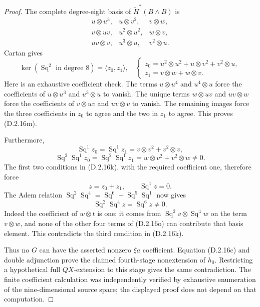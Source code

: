 \begin{proof}
The complete degree-eight basis of
$\widetilde H^*(B\wedge B)$ is
\[
\begin{array}{lll}
 u\otimes u^3,&u\otimes v^2,&v\otimes w,\\
 v\otimes uv,&u^2\otimes u^2,&w\otimes v,\\
 uv\otimes v,&u^3\otimes u,&v^2\otimes u.
\end{array}
 \tag{D.2.16l}
\]
Cartan gives
\[
 \ker(\operatorname{Sq}^2\text{ in degree }8)
       =\langle z_0,z_1\rangle,
 \quad
 \begin{cases}
 z_0=u^2\otimes u^2+u\otimes v^2+v^2\otimes u,\\
 z_1=v\otimes w+w\otimes v.
 \end{cases}
 \tag{D.2.16m}
\]
Here is an exhaustive coefficient check. The terms
$u\otimes u^4$ and $u^4\otimes u$ force the coefficients of
$u\otimes u^3$ and $u^3\otimes u$ to vanish. The unique terms
$w\otimes uv$ and $uv\otimes w$ force the coefficients of
$v\otimes uv$ and $uv\otimes v$ to vanish. The remaining
images force the three coefficients in $z_0$ to agree and the
two in $z_1$ to agree. This proves \textup{(D.2.16m)}.

Furthermore,
\[
 \operatorname{Sq}^1z_0=\operatorname{Sq}^1z_1
       =v\otimes v^2+v^2\otimes v,
\]
\[
 \operatorname{Sq}^2\operatorname{Sq}^1z_0
 =\operatorname{Sq}^2\operatorname{Sq}^1z_1
       =w\otimes v^2+v^2\otimes w\ne0.
 \tag{D.2.16n}
\]
The first two conditions in \textup{(D.2.16k)}, with the required
coefficient one, therefore force
\[
 z=z_0+z_1,
 \qquad\operatorname{Sq}^1z=0.
 \tag{D.2.16o}
\]
The Adem relation
$\operatorname{Sq}^2\operatorname{Sq}^4
 =\operatorname{Sq}^6+\operatorname{Sq}^5\operatorname{Sq}^1$
now gives
\[
 \operatorname{Sq}^2\operatorname{Sq}^4z
       =\operatorname{Sq}^6z\ne0.
 \tag{D.2.16p}
\]
Indeed the coefficient of $w\otimes t$ is one: it comes from
$\operatorname{Sq}^2v\otimes\operatorname{Sq}^4w$ on the term
$v\otimes w$, and none of the other four terms of
\textup{(D.2.16o)} can contribute that basis element.
This contradicts the third condition in \textup{(D.2.16k)}.

Thus no $G$ can have the asserted nonzero $\xi a$ coefficient.
Equation \textup{(D.2.16c)} and double adjunction prove the
claimed fourth-stage nonextension of $h_0$. Restricting a
hypothetical full $QX$-extension to this stage gives the same
contradiction.
The finite coefficient calculation was independently verified
by exhaustive enumeration of the nine-dimensional source space;
the displayed proof does not depend on that computation.
\end{proof}
